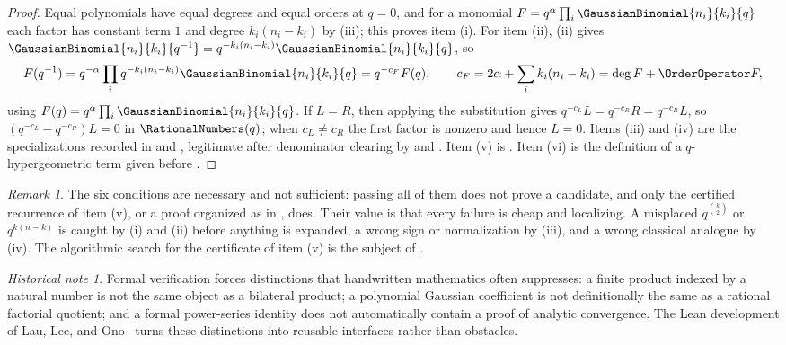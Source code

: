 \documentclass[11pt,a4paper,oneside,openany]{book}
\theoremstyle{definition}
\theoremstyle{remark}
\newtheorem{remark}[remark]{Remark}
\newtheorem{historicalnote}[historicalnote]{Historical note}
\begin{document}
\begin{proof}
Equal polynomials have equal degrees and equal orders at $q=0$, and for a
monomial $F=q^{\alpha}\prod_i\GaussianBinomial{n_i}{k_i}{q}$ each factor has constant term
$1$ and degree $k_i(n_i-k_i)$ by (iii); this proves
item (i).  For item (ii), (ii) gives
$\GaussianBinomial{n_i}{k_i}{q^{-1}}=q^{-k_i(n_i-k_i)}\GaussianBinomial{n_i}{k_i}{q}$, so
\[
 F(q^{-1})=q^{-\alpha}\prod_i q^{-k_i(n_i-k_i)}\GaussianBinomial{n_i}{k_i}{q}
 =q^{-c_F}F(q),
 \qquad
 c_F=2\alpha+\sum_ik_i(n_i-k_i)=\deg F+\OrderOperator F,
\]
using $F(q)=q^{\alpha}\prod_i\GaussianBinomial{n_i}{k_i}{q}$.  If $L=R$, then applying the
substitution gives $q^{-c_L}L=q^{-c_R}R=q^{-c_R}L$, so
$(q^{-c_L}-q^{-c_R})L=0$ in $\RationalNumbers(q)$; when $c_L\ne c_R$ the first factor is
nonzero and hence $L=0$.  Items (iii) and (iv) are the specializations
recorded in  and
, legitimate after denominator clearing by
 and .
Item (v) is .  Item (vi) is the definition of
a $q$-hypergeometric term given before .
\end{proof}

\begin{remark}\label{rem:tests-not-sufficient}
The six conditions are necessary and not sufficient: passing all of them does
not prove a candidate, and only the certified recurrence of item (v), or a
proof organized as in , does.  Their value is
that every failure is cheap and localizing.  A misplaced $q^{\binom k2}$ or
$q^{k(n-k)}$ is caught by (i) and (ii) before anything is expanded, a wrong
sign or normalization by (iii), and a wrong classical analogue by (iv).  The
algorithmic search for the certificate of item (v) is the subject of
\cite{PetkovsekWilfZeilberger1996}.
\end{remark}

\begin{historicalnote}
Formal verification forces distinctions that handwritten mathematics often suppresses: a finite product indexed by a natural number is not the same object as a bilateral product; a polynomial Gaussian coefficient is not definitionally the same as a rational factorial quotient; and a formal power-series identity does not automatically contain a proof of analytic convergence.  The Lean development of Lau, Lee, and Ono~\cite{LauLeeOno2026} turns these distinctions into reusable interfaces rather than obstacles.
\end{historicalnote}
\end{document}
